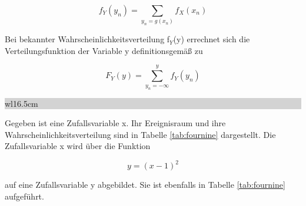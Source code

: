 \begin{equation}\label{eq:fourseventyeight}
f_{Y} (y_{n})=\sum _{y_{n} =g(x_{n})}f_{X}(x_{n})
\end{equation}

\noindent Bei bekannter Wahrscheinlichkeitsverteilung f$_{Y}$(y) errechnet sich die Verteilungsfunktion der Variable y definitionsgem\"{a}{\ss} zu

\begin{equation}\label{eq:fourseventynine}
F_{Y} (y)=\sum _{y_{n} =-\infty }^{y}f_{Y} (y_{n})
\end{equation}

\clearpage 

\noindent
\colorbox{lightgray}{%
%
\renewcommand\arraystretch{0.6}%
\begin{tabular}{ wl{16.5cm} }
{\selectfont{Beispiel: Abbildung einer diskreten Zufallsvariable}}
\end{tabular}%
}\medskip 

\noindent Gegeben ist eine Zufallsvariable x. Ihr Ereignisraum und ihre Wahrscheinlichkeitsverteilung sind in Tabelle \ref{tab:fournine} dargestellt. Die Zufallsvariable x wird \"{u}ber die Funktion 

\begin{equation}\label{eq:foureighty}
y=(x-1)^{2}
\end{equation}

\noindent auf eine Zufallsvariable y abgebildet. Sie ist ebenfalls in Tabelle \ref{tab:fournine} aufgef\"{u}hrt.

